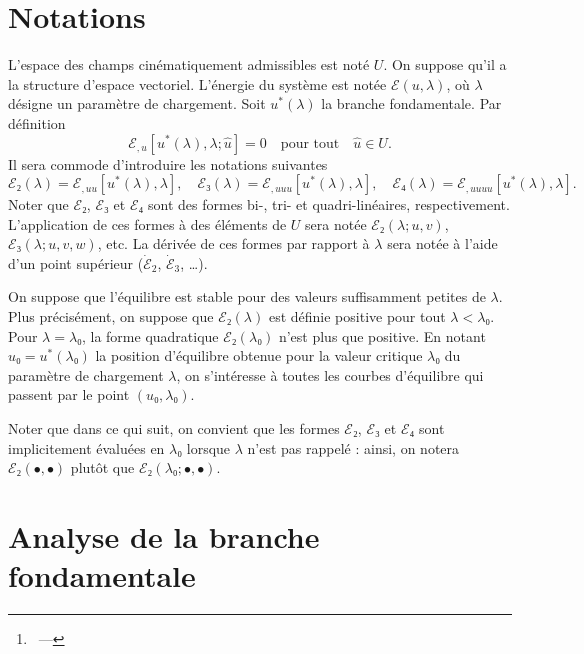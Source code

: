 \documentclass[12pt, final]{scrartcl}
\theoremstyle{definition}
\begin{document}
\title{\sbtitle}
\author{\sbauthor\thanks{\sbaddress~--- \sbemail}}
\maketitle

\begin{abstract}
 blabla
\end{abstract}


\section{Notations}

L'espace des champs cinématiquement admissibles est noté \(U\). On suppose qu'il
a la structure d'espace vectoriel. L'énergie du système est notée \(ℰ(u, λ)\),
où \(λ\) désigne un paramètre de chargement. Soit \(u^{\ast}(λ)\) la branche
fondamentale. Par définition
\begin{equation}
  ℰ_{,u}[u^{\ast}(λ), λ; \hat{u}]=0 \quad \text{pour tout} \quad \hat{u}∈U.
\end{equation}
Il sera commode d'introduire les notations suivantes
\begin{equation}
  ℰ₂(λ) = ℰ_{,uu}[u^{\ast}(λ), λ], \quad ℰ₃(λ) = ℰ_{,uuu}[u^{\ast}(λ), λ], \quad ℰ₄(λ) = ℰ_{,uuuu} [u^{\ast}(λ), λ].
\end{equation}
Noter que \(ℰ₂\), \(ℰ₃\) et \(ℰ₄\) sont des formes bi-, tri- et
quadri-linéaires, respectivement. L'application de ces formes à des éléments de
\(U\) sera notée \(ℰ₂(λ; u, v)\), \(ℰ₃(λ; u, v, w)\), etc. La dérivée de ces
formes par rapport à \(λ\) sera notée à l'aide d'un point supérieur
(\(\dot{ℰ}_2\), \(\dot{ℰ}_3\), \dots).

On suppose que l'équilibre est stable pour des valeurs suffisamment petites de
\(λ\). Plus précisément, on suppose que \(ℰ₂(λ)\) est définie positive pour tout
\(λ < λ₀\). Pour \(λ = λ₀\), la forme quadratique \(ℰ₂(λ₀)\) n'est plus que
positive. En notant \(u₀ = u^{\ast}(λ₀)\) la position d'équilibre obtenue pour
la valeur critique \(λ₀\) du paramètre de chargement \(λ\), on s'intéresse à
toutes les courbes d'équilibre qui passent par le point \((u₀, λ₀)\).

Noter que dans ce qui suit, on convient que les formes \(ℰ₂\), \(ℰ₃\) et \(ℰ₄\)
sont implicitement évaluées en \(λ₀\) lorsque \(λ\) n'est pas rappelé : ainsi,
on notera \(ℰ₂(•, •)\) plutôt que \(ℰ₂(λ₀ ; •, •)\).

\section{Analyse de la branche fondamentale}
\end{document}
